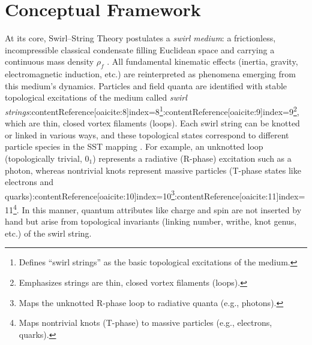 \documentclass[12pt]{article}
\begin{document}
\section{Conceptual Framework}\label{sec:framework}
    At its core, Swirl--String Theory postulates a \emph{swirl medium}: a frictionless, incompressible classical condensate filling Euclidean space and carrying a continuous mass density $\rho_{\!f}$ \cite{Iskandarani2025Canon}. All fundamental kinematic effects (inertia, gravity, electromagnetic induction, etc.) are reinterpreted as phenomena emerging from this medium’s dynamics. Particles and field quanta are identified with stable topological excitations of the medium called \emph{swirl strings}:contentReference[oaicite:8]{index=8}\footnote{Defines ``swirl strings'' as the basic topological excitations of the medium.}:contentReference[oaicite:9]{index=9}\footnote{Emphasizes strings are thin, closed vortex filaments (loops).}, which are thin, closed vortex filaments (loops). Each swirl string can be knotted or linked in various ways, and these topological states correspond to different particle species in the SST mapping \cite{Iskandarani2025Canon}. For example, an unknotted loop (topologically trivial, $0_1$) represents a radiative (R-phase) excitation such as a photon, whereas nontrivial knots represent massive particles (T-phase states like electrons and quarks):contentReference[oaicite:10]{index=10}\footnote{Maps the unknotted R-phase loop to radiative quanta (e.g., photons).}:contentReference[oaicite:11]{index=11}\footnote{Maps nontrivial knots (T-phase) to massive particles (e.g., electrons, quarks).}. In this manner, quantum attributes like charge and spin are not inserted by hand but arise from topological invariants (linking number, writhe, knot genus, etc.) of the swirl string.
\end{document}
